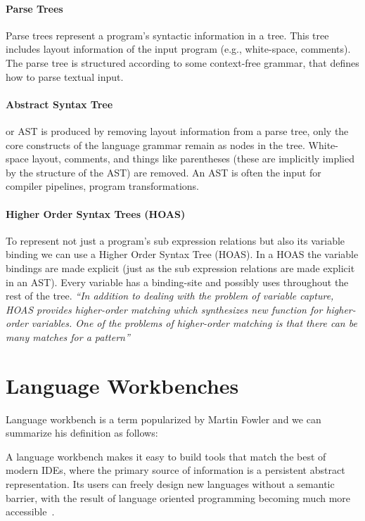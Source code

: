 \paragraph{Parse Trees}
Parse trees represent a program's syntactic information in a tree. This tree includes layout information of the input program (e.g.,  white-space, comments). The parse tree is structured according to some context-free grammar, that defines how to parse textual input.

\paragraph{Abstract Syntax Tree}
or AST is produced by removing layout information from a parse tree, only the core constructs of the language grammar remain as nodes in the tree. White-space layout, comments, and things like parentheses (these are implicitly implied by the structure of the AST) are removed. An AST is often the input for compiler pipelines, program transformations.

\paragraph{Higher Order Syntax Trees (HOAS)}
To represent not just a program's sub expression relations but also its variable binding we can use a Higher Order Syntax Tree (HOAS)\cite{Pfenning1988}. In a HOAS the variable bindings are made explicit (just as the sub expression relations are made explicit in an AST). Every variable has a binding-site and possibly uses throughout the rest of the tree. \textit{``In addition to dealing with the problem of variable capture, HOAS provides higher-order matching which synthesizes new function for higher-order  variables. One of the problems of higher-order matching is that there can be many matches for a pattern''}~\cite{Visser2001}


\section{Language Workbenches} \label{rascal}
Language workbench is a term popularized by Martin Fowler and we can summarize his definition as follows:

A language workbench makes it easy to build tools that match the best of modern IDEs, where the primary source of information is a persistent abstract representation. Its users can freely design new languages without a semantic barrier, with the result of language oriented programming becoming much more accessible~\cite{Fowler2005}.

